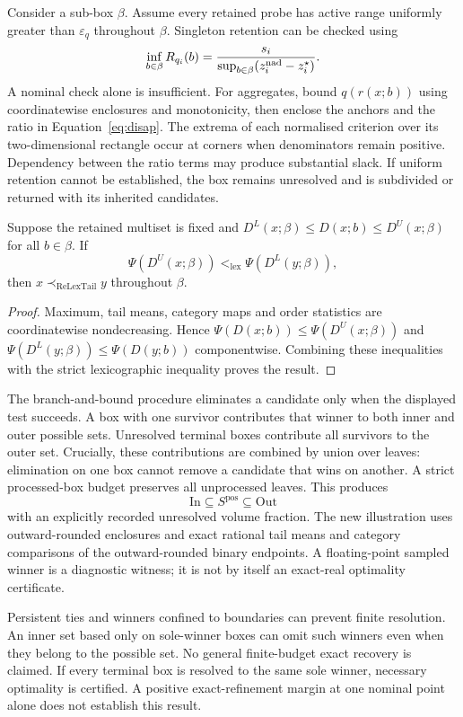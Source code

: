 Consider a sub-box $\beta$. Assume every retained probe has active range uniformly greater than $\varepsilon_q$ throughout $\beta$. Singleton retention can be checked using
\[
\inf_{b\in\beta}R_{q_i}(b)=\frac{s_i}{\sup_{b\in\beta}(z^{\mathrm{nad}}_i-z^\star_i)}.
\]
A nominal check alone is insufficient. For aggregates, bound $q(r(x;b))$ using coordinatewise enclosures and monotonicity, then enclose the anchors and the ratio in Equation~\eqref{eq:disap}. The extrema of each normalised criterion over its two-dimensional rectangle occur at corners when denominators remain positive. Dependency between the ratio terms may produce substantial slack. If uniform retention cannot be established, the box remains unresolved and is subdivided or returned with its inherited candidates.

\begin{proposition}\label{prop:certsound}
Suppose the retained multiset is fixed and $D^L(x;\beta)\le D(x;b)\le D^U(x;\beta)$ for all $b\in\beta$. If
\[
\Psi(D^U(x;\beta))<_{\mathrm{lex}}\Psi(D^L(y;\beta)),
\]
then $x\prec_{\mathrm{ReLexTail}}y$ throughout $\beta$.
\end{proposition}
\begin{proof}
Maximum, tail means, category maps and order statistics are coordinatewise nondecreasing. Hence $\Psi(D(x;b))\le\Psi(D^U(x;\beta))$ and $\Psi(D^L(y;\beta))\le\Psi(D(y;b))$ componentwise. Combining these inequalities with the strict lexicographic inequality proves the result.
\end{proof}

The branch-and-bound procedure eliminates a candidate only when the displayed test succeeds. A box with one survivor contributes that winner to both inner and outer possible sets. Unresolved terminal boxes contribute all survivors to the outer set. Crucially, these contributions are combined by union over leaves: elimination on one box cannot remove a candidate that wins on another. A strict processed-box budget preserves all unprocessed leaves. This produces
\[
\mathrm{In}\subseteq S^{\mathrm{pos}}\subseteq\mathrm{Out}
\]
with an explicitly recorded unresolved volume fraction. The new illustration uses outward-rounded enclosures and exact rational tail means and category comparisons of the outward-rounded binary endpoints. A floating-point sampled winner is a diagnostic witness; it is not by itself an exact-real optimality certificate.

Persistent ties and winners confined to boundaries can prevent finite resolution. An inner set based only on sole-winner boxes can omit such winners even when they belong to the possible set. No general finite-budget exact recovery is claimed. If every terminal box is resolved to the same sole winner, necessary optimality is certified. A positive exact-refinement margin at one nominal point alone does not establish this result.

